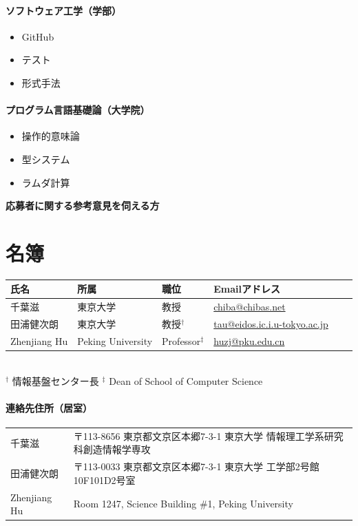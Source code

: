\documentclass[dvipdfmx]{jsarticle}
\begin{document}
\paragraph{ソフトウェア工学（学部）}
\begin{itemize}
 \item GitHub
 \item テスト
 \item 形式手法
\end{itemize}

\paragraph{プログラム言語基礎論（大学院）}
\begin{itemize}
 \item 操作的意味論
 \item 型システム
 \item ラムダ計算
\end{itemize}

\newpage
\begin{center}
\LARGE\bfseries 応募者に関する参考意見を伺える方
\end{center}
\bigskip

\section*{名簿}
\begin{center}
\begin{tabular}[t]{llllll}
氏名 & 所属 & 職位 & Emailアドレス \\ \hline
千葉滋 & 東京大学 & 教授 & \url{chiba@chibas.net}  \\
田浦健次朗 & 東京大学 & 教授$^\dagger$ & \url{tau@eidos.ic.i.u-tokyo.ac.jp} \\
Zhenjiang Hu & Peking University & Professor$^\ddagger$ & \url{huzj@pku.edu.cn} \\
\end{tabular}
\medskip\\
\noindent
$^\dagger$ 情報基盤センター長
\qquad
\noindent
$^\ddagger$ Dean of School of Computer Science
\end{center}
\paragraph{連絡先住所（居室）}
\begin{center}
\begin{tabular}[t]{ll}
千葉滋 & 〒113-8656 東京都文京区本郷7-3-1 東京大学 情報理工学系研究科創造情報学専攻 \\
田浦健次朗 & 〒113-0033 東京都文京区本郷7-3-1 東京大学 工学部2号館10F101D2号室 \\
Zhenjiang Hu & Room 1247, Science Building \#1, Peking University \\
\end{tabular}
\end{center}
\end{document}
